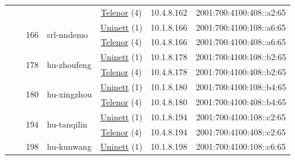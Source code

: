 \begin{small}
\begin{center}
\begin{longtable}{|c|c|c|c|c|c|c|c|}
  &  &  &  & \multicolumn{2}{|c|}{\tiny{\href{https://www.telenor.no}{Telenor} (4)}} & \tiny{10.4.8.162} & \tiny{2001:700:4100:408::a2:65} \\* \cline{3-3}\cline{4-4}\cline{5-5}\cline{6-6}\cline{7-7}\cline{8-8}
  &  & \multirow{2}{*}{\tiny{166}} & \multicolumn{1}{|l|}{\multirow{2}{*}{\tiny{srl-nndemo}}} & \multicolumn{2}{|c|}{\tiny{\href{https://www.uninett.no}{Uninett} (1)}} & \tiny{10.1.8.166} & \tiny{2001:700:4100:108::a6:65} \\* \cline{5-5}\cline{6-6}\cline{7-7}\cline{8-8}
  &  &  &  & \multicolumn{2}{|c|}{\tiny{\href{https://www.telenor.no}{Telenor} (4)}} & \tiny{10.4.8.166} & \tiny{2001:700:4100:408::a6:65} \\* \cline{3-3}\cline{4-4}\cline{5-5}\cline{6-6}\cline{7-7}\cline{8-8}
  &  & \multirow{2}{*}{\tiny{178}} & \multicolumn{1}{|l|}{\multirow{2}{*}{\tiny{hu-zhoufeng}}} & \multicolumn{2}{|c|}{\tiny{\href{https://www.uninett.no}{Uninett} (1)}} & \tiny{10.1.8.178} & \tiny{2001:700:4100:108::b2:65} \\* \cline{5-5}\cline{6-6}\cline{7-7}\cline{8-8}
  &  &  &  & \multicolumn{2}{|c|}{\tiny{\href{https://www.telenor.no}{Telenor} (4)}} & \tiny{10.4.8.178} & \tiny{2001:700:4100:408::b2:65} \\* \cline{3-3}\cline{4-4}\cline{5-5}\cline{6-6}\cline{7-7}\cline{8-8}
  &  & \multirow{2}{*}{\tiny{180}} & \multicolumn{1}{|l|}{\multirow{2}{*}{\tiny{hu-xingzhou}}} & \multicolumn{2}{|c|}{\tiny{\href{https://www.uninett.no}{Uninett} (1)}} & \tiny{10.1.8.180} & \tiny{2001:700:4100:108::b4:65} \\* \cline{5-5}\cline{6-6}\cline{7-7}\cline{8-8}
  &  &  &  & \multicolumn{2}{|c|}{\tiny{\href{https://www.telenor.no}{Telenor} (4)}} & \tiny{10.4.8.180} & \tiny{2001:700:4100:408::b4:65} \\* \cline{3-3}\cline{4-4}\cline{5-5}\cline{6-6}\cline{7-7}\cline{8-8}
  &  & \multirow{2}{*}{\tiny{194}} & \multicolumn{1}{|l|}{\multirow{2}{*}{\tiny{hu-tanqilin}}} & \multicolumn{2}{|c|}{\tiny{\href{https://www.uninett.no}{Uninett} (1)}} & \tiny{10.1.8.194} & \tiny{2001:700:4100:108::c2:65} \\* \cline{5-5}\cline{6-6}\cline{7-7}\cline{8-8}
  &  &  &  & \multicolumn{2}{|c|}{\tiny{\href{https://www.telenor.no}{Telenor} (4)}} & \tiny{10.4.8.194} & \tiny{2001:700:4100:408::c2:65} \\* \cline{3-3}\cline{4-4}\cline{5-5}\cline{6-6}\cline{7-7}\cline{8-8}
  &  & \multirow{2}{*}{\tiny{198}} & \multicolumn{1}{|l|}{\multirow{2}{*}{\tiny{hu-kunwang}}} & \multicolumn{2}{|c|}{\tiny{\href{https://www.uninett.no}{Uninett} (1)}} & \tiny{10.1.8.198} & \tiny{2001:700:4100:108::c6:65} \\* \cline{5-5}\cline{6-6}\cline{7-7}\cline{8-8}

\end{longtable}
\end{center}
\end{small}
